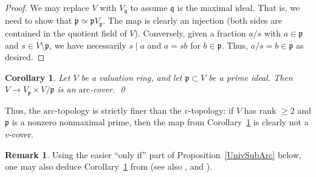 \documentclass[reqno]{amsart}
\newcommand{\arc}{\mathrm{arc}}
\newtheorem{corollary}[theorem]{Corollary}
\theoremstyle{definition}
\newtheorem{remark}[theorem]{Remark}
\begin{document}
\begin{proof}
We may replace $V$ with $V_{\mathfrak{q}}$ to assume $\mathfrak{q}$
is the maximal ideal. 
That is, 
we need to show that $\mathfrak{p} \simeq \mathfrak{p} V_{\mathfrak{p}}$. The
map is clearly an injection (both sides are contained in the quotient field of
$V$). Conversely, given a fraction $a/s$ with $a \in \mathfrak{p}$ and $s \in V
\setminus \mathfrak{p}$, we have necessarily $s \mid a$ and $a =sb$ for $b \in
\mathfrak{p}$. Thus, $a/s = b\in \mathfrak{p}$ as desired. 
\end{proof}


\begin{corollary}
\label{v1val}
Let $V$ be a valuation ring, and let $\mathfrak{p} \subset V$ be a prime ideal.
Then $V \to V_{\mathfrak{p}} \times V/\mathfrak{p}$ is an $\arc$-cover. \qed
\end{corollary}

Thus, the $\arc$-topology is strictly finer than the $v$-topology: if $V$ has rank $\geq 2$ and $\mathfrak{p}$ is a nonzero nonmaximal prime, then the map from Corollary~\ref{v1val} is clearly not a $v$-cover.

\begin{remark}
Using the easier ``only if'' part of Proposition~\ref{UnivSubArc} below, one may also deduce Corollary~\ref{v1val} from \cite[Corollary 33]{Pic} (see also \cite[Ex. 4.5]{GooLi}, and \cite[Ex. 4.3]{Rydh}).
\end{remark}
\end{document}
